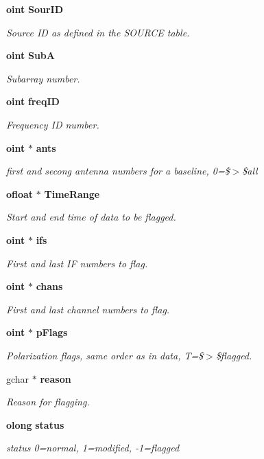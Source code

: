 \begin{CompactItemize}
{\bf oint} {\bf Sour\-ID}
\begin{CompactList}\small\item\em Source ID as defined in the SOURCE table. \item\end{CompactList}\item 
{\bf oint} {\bf Sub\-A}
\begin{CompactList}\small\item\em Subarray number. \item\end{CompactList}\item 
{\bf oint} {\bf freq\-ID}
\begin{CompactList}\small\item\em Frequency ID number. \item\end{CompactList}\item 
{\bf oint} $\ast$ {\bf ants}
\begin{CompactList}\small\item\em first and secong antenna numbers for a baseline, 0=\$$>$\$all \item\end{CompactList}\item 
{\bf ofloat} $\ast$ {\bf Time\-Range}
\begin{CompactList}\small\item\em Start and end time of data to be flagged. \item\end{CompactList}\item 
{\bf oint} $\ast$ {\bf ifs}
\begin{CompactList}\small\item\em First and last IF numbers to flag. \item\end{CompactList}\item 
{\bf oint} $\ast$ {\bf chans}
\begin{CompactList}\small\item\em First and last channel numbers to flag. \item\end{CompactList}\item 
{\bf oint} $\ast$ {\bf p\-Flags}
\begin{CompactList}\small\item\em Polarization flags, same order as in data, T=\$$>$\$flagged. \item\end{CompactList}\item 
gchar $\ast$ {\bf reason}
\begin{CompactList}\small\item\em Reason for flagging. \item\end{CompactList}\item 
{\bf olong} {\bf status}
\begin{CompactList}\small\item\em status 0=normal, 1=modified, -1=flagged \item\end{CompactList}\end{CompactItemize}


